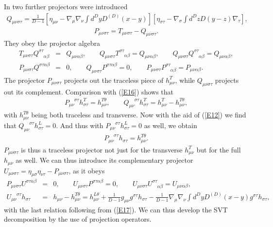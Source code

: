 \documentclass[aps]{revtex4}
\begin{document}
In \cite{Mannheim2005} two further projectors were introduced
%
\begin{eqnarray}
Q_{\mu\nu\sigma\tau}=\frac{1}{D-1}\left[\eta_{\mu\nu}
-\nabla_{\mu}\nabla_{\nu}\int d^DyD^{(D)}(x-y)\right]
\left[\eta_{\sigma\tau}-\nabla_{\sigma}\int
d^DzD(y-z)\nabla_{\tau}\right],
\label{E29}
\end{eqnarray}
%
%
\begin{eqnarray}
P_{\mu\nu\sigma\tau}=T_{\mu\nu\sigma\tau}-Q_{\mu\nu\sigma\tau}.
\label{E30}
\end{eqnarray}
%  
They obey the projector algebra
%
\begin{eqnarray}
T_{\mu\nu\sigma\tau}Q^{\sigma\tau}_{\phantom{\sigma\tau}\alpha\beta}
&=&Q_{\mu\nu\alpha\beta},\qquad
Q_{\mu\nu\sigma\tau}T^{\sigma\tau}_{\phantom{\sigma\tau}\alpha\beta}
=Q_{\mu\nu\alpha\beta},\qquad
Q_{\mu\nu\sigma\tau}Q^{\sigma\tau}_{\phantom{\sigma\tau}\alpha\beta}
=Q_{\mu\nu\alpha\beta}, 
\nonumber\\
P_{\mu\nu\sigma\tau}Q^{\sigma\tau\alpha\beta}&=&0,\qquad
Q_{\mu\nu\sigma\tau}P^{\sigma\tau\alpha\beta}=0,\qquad
P_{\mu\nu\sigma\tau}P^{\sigma\tau}_{\phantom{\sigma\tau}\alpha\beta}
=P_{\mu\nu\alpha\beta}.
\label{E31}
\end{eqnarray}
%
The projector $P_{\mu\nu\sigma\tau}$ projects out the traceless piece of $h^T_{\mu\nu}$, while $Q_{\mu\nu\sigma\tau}$ projects out its complement.  Comparison with (\ref{E16}) shows that 
%
\begin{eqnarray}
P_{\mu\nu}^{\phantom{\mu\nu}\sigma\tau}h^T_{\sigma\tau}=h^{T\theta}_{\mu\nu},\qquad 
Q_{\mu\nu}^{\phantom{\mu\nu}\sigma\tau}h^T_{\sigma\tau}
=h^T_{\mu\nu}-h^{T\theta}_{\mu\nu},
\label{E32}
\end{eqnarray}
% 
with $h^{T\theta}_{\mu\nu}$ being both traceless and transverse. Now with the aid of (\ref{E12}) we find that $Q_{\mu\nu}^{\phantom{\mu\nu}\sigma\tau}h^L_{\sigma\tau}=0$. And thus with $P_{\mu\nu}^{\phantom{\mu\nu}\sigma\tau}h^L_{\sigma\tau}=0$ as well, we obtain 
%
\begin{eqnarray}
 P_{\mu\nu}^{\phantom{\mu\nu}\sigma\tau}h_{\sigma\tau}=h^{T\theta}_{\mu\nu}.
\label{E33}
\end{eqnarray}
%
$P_{\mu\nu\sigma\tau}$ is thus a traceless projector not just for the transverse $h_{\mu\nu}^T$ but for the full $h_{\mu\nu}$ as well. We can thus introduce its complementary projector $U_{\mu\nu\sigma\tau}=\eta_{\mu\sigma}\eta_{\nu\tau}-P_{\mu\nu\sigma\tau}$, as it obeys
%
\begin{eqnarray}
P_{\mu\nu\sigma\tau}U^{\sigma\tau\alpha\beta}&=&0,\qquad
U_{\mu\nu\sigma\tau}P^{\sigma\tau\alpha\beta}=0,\qquad
U_{\mu\nu\sigma\tau}U^{\sigma\tau}_{\phantom{\sigma\tau}\alpha\beta}
=U_{\mu\nu\alpha\beta},
\nonumber\\
U_{\mu\nu}^{\phantom{\mu\nu}\sigma\tau}h_{\sigma\tau}&=&h_{\mu\nu}-h^{T\theta}_{\mu\nu}=
h^{L\theta}_{\mu\nu}+\frac{1}{D-1}g_{\mu\nu}g^{\sigma\tau}h_{\sigma\tau}
-\frac{1}{D-1}\nabla_{\mu}\nabla_{\nu}\int d^Dy D^{(D)}(x-y)g^{\sigma\tau}h_{\sigma\tau},
\label{E34}
\end{eqnarray}
% 
with the last relation following from (\ref{E17}). We can thus develop the SVT decomposition by the use of projection operators.
\end{document}

